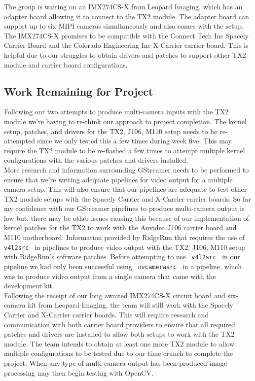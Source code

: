\documentclass[letterpaper,10pt,serif,draftclsnofoot,onecolumn,compsoc,titlepage]{IEEEtran}
\begin{document}
The group is waiting on an IMX274CS-X from Leopard Imaging, which has an 
adapter board allowing it to connect to the TX2 module. The adapter board can support 
up to six MIPI cameras simultaneously and also comes with the setup. The IMX274CS-X 
promises to be compatible with the Connect Tech Inc Spacely Carrier
Board and the Colorado Engineering Inc X-Carrier carrier board. This is helpful due to 
our struggles to obtain drivers and patches to support other TX2 module and carrier 
board configurations. \\


\subsection{Work Remaining for Project}

Following our two attempts to produce multi-camera inputs with the TX2 module 
we're having to re-think our approach to project completion. The kernel setup, patches, 
and drivers for the TX2, J106, M110 setup needs to be re-attempted since we only tested 
this a few times during week five. This may require the TX2 module to be re-flashed a 
few times to attempt multiple kernel configurations with the various patches and drivers 
installed. \\

More research and information surrounding GStreamer needs to be performed to ensure that we're 
writing adequate pipelines for video output for a multiple camera setup. 
This will also ensure that our pipelines are adequate to test other TX2 module setups 
with the Spacely Carrier and X-Carrier carrier boards.
So far my confidence with our GStreamer pipelines to produce multi-camera output is 
low but, there may be other issues causing this because of our implementation of kernel 
patches for the TX2 to work with the Auvidea J106 carrier board and M110 motherboard. 
Information provided by RidgeRun that requires the use of 
\texttt{ v4l2src } in pipelines to produce video output with the TX2, J106, M110 setup with 
RidgeRun's software patches. 
Before attempting to use \texttt{ v4l2src } in our pipeline we had only been successful 
using \texttt{ nvcamerasrc } in a pipeline, which was to produce video output from a 
single camera that came with the development kit. \\

Following the receipt of our long awaited IMX274CS-X circuit board and six-camera kit 
from Leopard Imaging, the team will 
still work with the Spacely Carrier and X-Carrier carrier boards. This will 
require research and communication with both carrier board providers to ensure that 
all required patches and drivers are installed 
to allow both setups to work with the TX2 module. The team intends to obtain at 
least one more TX2 module to allow multiple configurations to be tested due to our 
time crunch to complete the project. When any type of multi-camera output has been 
produced image processing may then begin testing with OpenCV. \\
\end{document}
